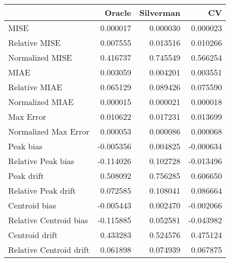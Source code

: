 \begin{tabular}{lrrr}
  \hline
 & Oracle & Silverman & CV \\ 
  \hline
MISE & 0.000017 & 0.000030 & 0.000023 \\ 
  Relative MISE & 0.007555 & 0.013516 & 0.010266 \\ 
  Normalized MISE & 0.416737 & 0.745549 & 0.566254 \\ 
  MIAE & 0.003059 & 0.004201 & 0.003551 \\ 
  Relative MIAE & 0.065129 & 0.089426 & 0.075590 \\ 
  Normalized MIAE & 0.000015 & 0.000021 & 0.000018 \\ 
  Max Error & 0.010622 & 0.017231 & 0.013699 \\ 
  Normalized Max Error & 0.000053 & 0.000086 & 0.000068 \\ 
  Peak bias & -0.005356 & 0.004825 & -0.000634 \\ 
  Relative Peak bias & -0.114026 & 0.102728 & -0.013496 \\ 
  Peak drift & 0.508092 & 0.756285 & 0.606650 \\ 
  Relative Peak drift & 0.072585 & 0.108041 & 0.086664 \\ 
  Centroid bias & -0.005443 & 0.002470 & -0.002066 \\ 
  Relative Centroid bias & -0.115885 & 0.052581 & -0.043982 \\ 
  Centroid drift & 0.433283 & 0.524576 & 0.475124 \\ 
  Relative Centroid drift & 0.061898 & 0.074939 & 0.067875 \\ 
   \hline
\end{tabular}
